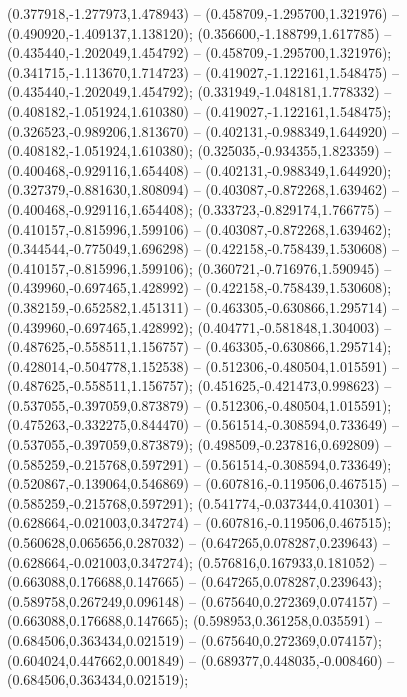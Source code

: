  (0.377918,-1.277973,1.478943) -- (0.458709,-1.295700,1.321976) -- (0.490920,-1.409137,1.138120);
 (0.356600,-1.188799,1.617785) -- (0.435440,-1.202049,1.454792) -- (0.458709,-1.295700,1.321976);
 (0.341715,-1.113670,1.714723) -- (0.419027,-1.122161,1.548475) -- (0.435440,-1.202049,1.454792);
 (0.331949,-1.048181,1.778332) -- (0.408182,-1.051924,1.610380) -- (0.419027,-1.122161,1.548475);
 (0.326523,-0.989206,1.813670) -- (0.402131,-0.988349,1.644920) -- (0.408182,-1.051924,1.610380);
 (0.325035,-0.934355,1.823359) -- (0.400468,-0.929116,1.654408) -- (0.402131,-0.988349,1.644920);
 (0.327379,-0.881630,1.808094) -- (0.403087,-0.872268,1.639462) -- (0.400468,-0.929116,1.654408);
 (0.333723,-0.829174,1.766775) -- (0.410157,-0.815996,1.599106) -- (0.403087,-0.872268,1.639462);
 (0.344544,-0.775049,1.696298) -- (0.422158,-0.758439,1.530608) -- (0.410157,-0.815996,1.599106);
 (0.360721,-0.716976,1.590945) -- (0.439960,-0.697465,1.428992) -- (0.422158,-0.758439,1.530608);
 (0.382159,-0.652582,1.451311) -- (0.463305,-0.630866,1.295714) -- (0.439960,-0.697465,1.428992);
 (0.404771,-0.581848,1.304003) -- (0.487625,-0.558511,1.156757) -- (0.463305,-0.630866,1.295714);
 (0.428014,-0.504778,1.152538) -- (0.512306,-0.480504,1.015591) -- (0.487625,-0.558511,1.156757);
 (0.451625,-0.421473,0.998623) -- (0.537055,-0.397059,0.873879) -- (0.512306,-0.480504,1.015591);
 (0.475263,-0.332275,0.844470) -- (0.561514,-0.308594,0.733649) -- (0.537055,-0.397059,0.873879);
 (0.498509,-0.237816,0.692809) -- (0.585259,-0.215768,0.597291) -- (0.561514,-0.308594,0.733649);
 (0.520867,-0.139064,0.546869) -- (0.607816,-0.119506,0.467515) -- (0.585259,-0.215768,0.597291);
 (0.541774,-0.037344,0.410301) -- (0.628664,-0.021003,0.347274) -- (0.607816,-0.119506,0.467515);
 (0.560628,0.065656,0.287032) -- (0.647265,0.078287,0.239643) -- (0.628664,-0.021003,0.347274);
 (0.576816,0.167933,0.181052) -- (0.663088,0.176688,0.147665) -- (0.647265,0.078287,0.239643);
 (0.589758,0.267249,0.096148) -- (0.675640,0.272369,0.074157) -- (0.663088,0.176688,0.147665);
 (0.598953,0.361258,0.035591) -- (0.684506,0.363434,0.021519) -- (0.675640,0.272369,0.074157);
 (0.604024,0.447662,0.001849) -- (0.689377,0.448035,-0.008460) -- (0.684506,0.363434,0.021519);
